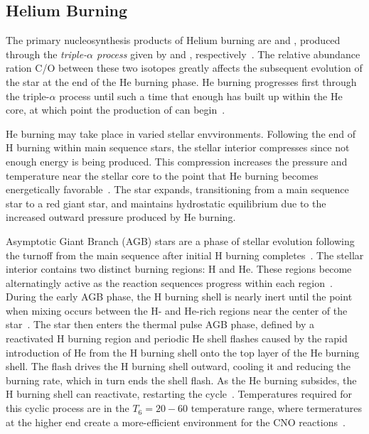 \subsection{Helium Burning}

The primary nucleosynthesis products of Helium burning are 
and , produced through the \emph{triple-$\alpha$ process}
given by  and
,
respectively~\cite{Aliotta2016}. The relative abundance ration C/O
between these two isotopes greatly affects the subsequent evolution of
the star at the end of the He burning phase. He burning progresses first
through the triple-$\alpha$ process until such a time that enough
 has built up within the He core, at which point the
production of  can begin~\cite{Aliotta2016}.

He burning may take place in varied stellar envvironments. Following the
end of H burning within main sequence stars, the stellar interior
compresses since not enough energy is being produced. This compression
increases the pressure and temperature near the stellar core to the
point that He burning becomes energetically
favorable~\cite{CarrollOstlie}. The star expands, transitioning from a
main sequence star to a red giant star, and maintains hydrostatic
equilibrium due to the increased outward pressure produced by He
burning.

Asymptotic Giant Branch (AGB) stars are a phase of stellar evolution
following the turnoff from the main sequence after initial H burning
completes~\cite{CarrollOstlie}. The stellar interior contains two
distinct burning regions: H and He. These regions become alternatingly
active as the reaction sequences progress within each
region~\cite{Aliotta2016}. During the early AGB phase, the H burning
shell is nearly inert until the point when mixing occurs between the H-
and He-rich regions near the center of the star~\cite{CarrollOstlie}.
The star then enters the thermal pulse AGB phase, defined by a
reactivated H burning region and periodic He shell flashes caused by the
rapid introduction of He from the H burning shell onto the top layer of
the He burning shell. The flash drives the H burning shell outward,
cooling it and reducing the burning rate, which in turn ends the shell
flash. As the He burning subsides, the H burning shell can reactivate,
restarting the cycle~\cite{CarrollOstlie}. Temperatures required for
this cyclic process are in the $T_6 = 20 - 60$ temperature range, where
termeratures at the higher end create a more-efficient environment for
the CNO reactions~\cite{Boeltzig2016}.

